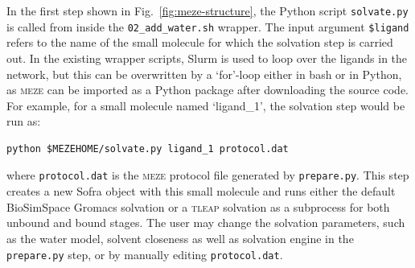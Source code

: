\begin{tcolorbox}
[title=Meze-updated directory tree, colframe=myframecolour]
\end{tcolorbox}

In the first step shown in Fig.~\ref{fig:meze-structure}, the Python script \texttt{solvate.py} is called from inside the \texttt{02\_add\_water.sh} wrapper. The input argument \texttt{\$ligand} refers to the name of the small molecule for which the solvation step is carried out. In the existing wrapper scripts, Slurm is used to loop over the ligands in the network, but this can be overwritten by a `for'-loop either in bash or in Python, as \textsc{meze} can be imported as a Python package after downloading the source code. For example, for a small molecule named `ligand\_1', the solvation step would be run as:

\begin{tcolorbox}[title=Solvation:,breakable, colframe=myframecolour]
\begin{verbatim}
python $MEZEHOME/solvate.py ligand_1 protocol.dat 
\end{verbatim}
\end{tcolorbox}
\noindent where \texttt{protocol.dat} is the \textsc{meze} protocol file generated by \texttt{prepare.py}. This step creates a new Sofra object with this small molecule and runs either the default BioSimSpace Gromacs solvation or a \textsc{tleap} solvation as a subprocess for both unbound and bound stages. The user may change the solvation parameters, such as the water model, solvent closeness as well as solvation engine in the \texttt{prepare.py} step, or by manually editing \texttt{protocol.dat}. 


